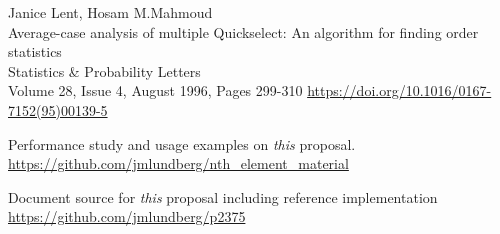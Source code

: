 \begin{thebibliography}{9}
Janice Lent, Hosam M.Mahmoud\\
Average-case analysis of multiple Quickselect: An algorithm for finding order statistics\\
Statistics \& Probability Letters \\
Volume 28, Issue 4, August 1996, Pages 299-310
\url{https://doi.org/10.1016/0167-7152(95)00139-5}


Performance study and usage examples on \emph{this} proposal.\\
\url{https://github.com/jmlundberg/nth_element_material}

Document source for \emph{this} proposal including reference implementation\\
\url{https://github.com/jmlundberg/p2375}

\end{thebibliography}
\let\addcontentsline\oldaddcontentsline%


